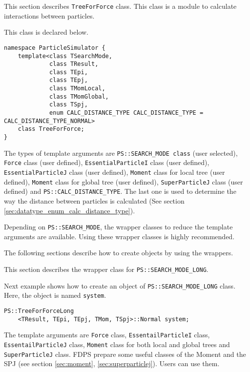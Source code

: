 This section describes {\tt TreeForForce} class. This class is a
module to calculate interactions between particles.

\label{sec:module_standard_treeforce_object}

This class is declared below.

\begin{lstlisting}[caption=TreeForForce0]
namespace ParticleSimulator {
    template<class TSearchMode,
             class TResult,
             class TEpi,
             class TEpj,
             class TMomLocal,
             class TMomGlobal,
             class TSpj,
             enum CALC_DISTANCE_TYPE CALC_DISTANCE_TYPE = CALC_DISTANCE_TYPE_NORMAL>
    class TreeForForce;
}
\end{lstlisting}


The types of template arguments are {\tt PS::SEARCH\_MODE class} (user
selected), {\tt Force} class (user defined), {\tt EssentialParticleI}
class (user defined), {\tt EssentialParticleJ} class (user defined),
{\tt Moment} class for local tree (user defined), {\tt Moment} class
for global tree (user defined), {\tt SuperParticleJ} class (user
defined) and  {\tt PS::CALC\_DISTANCE\_TYPE}. The last one is used to
determine the way the distance between particles is calculated
(See section \ref{sec:datatype_enum_calc_distance_type}).

Depending on {\tt PS::SEARCH\_MODE}, the wrapper classes to reduce the template arguments are available. Using these wrapper classes is highly recommended.

The following sections describe how to create objects by using the wrappers.

\label{sec:module_treeforce_standard_search_mode_long}

This section describes the wrapper class for {\tt PS::SEARCH\_MODE\_LONG}.


Next example shows how to create an object of {\tt PS::SEARCH\_MODE\_LONG} class.  Here, the object is named {\tt system}.

\begin{screen}
\begin{verbatim}
PS::TreeForForceLong
    <TResult, TEpi, TEpj, TMom, TSpj>::Normal system;
\end{verbatim}
\end{screen}

The template arguments are {\tt Force} class, {\tt EssentailParticleI} class, {\tt EssentailParticleJ} class, {\tt Moment} class for both local and global trees and {\tt SuperParticleJ} class. FDPS prepare some useful classes of the Moment and the SPJ (see section \ref{sec:moment}, \ref{sec:superparticlej}). Users can use them.

